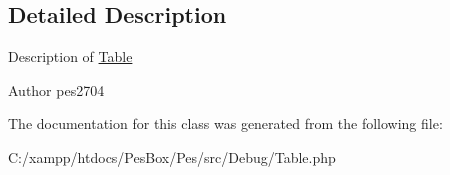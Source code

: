 \subsection{Detailed Description}
Description of \mbox{\hyperlink{class_pes_1_1_debug_1_1_table}{Table}}

\begin{DoxyAuthor}{Author}
pes2704 
\end{DoxyAuthor}


The documentation for this class was generated from the following file\+:\begin{DoxyCompactItemize}
\item 
C\+:/xampp/htdocs/\+Pes\+Box/\+Pes/src/\+Debug/Table.\+php\end{DoxyCompactItemize}
